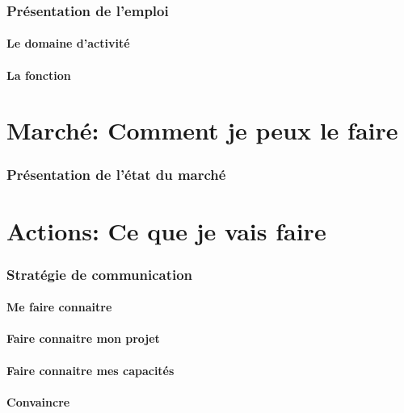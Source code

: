 \documentclass[a4paper]{report}
\begin{document}
\section{Présentation de l'emploi}
\subsection{Le domaine d'activité}
\subsection{La fonction}

\part{Marché: Comment je peux le faire}
\section{Présentation de l'état du marché}

\part{Actions: Ce que je vais faire}
\section{Stratégie de communication}
\subsection{Me faire connaitre}
\subsection{Faire connaitre mon projet}
\subsection{Faire connaitre mes capacités}
\subsection{Convaincre} 
\end{document}
